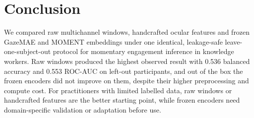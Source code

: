 \section{Conclusion}

We compared raw multichannel windows, handcrafted ocular features and frozen GazeMAE and MOMENT embeddings under one identical, leakage-safe leave-one-subject-out protocol for momentary engagement inference in knowledge workers.
Raw windows produced the highest observed result with 0.536 balanced accuracy and 0.553 ROC-AUC on left-out participants, and out of the box the frozen encoders did not improve on them, despite their higher preprocessing and compute cost.
For practitioners with limited labelled data, raw windows or handcrafted features are the better starting point, while frozen encoders need domain-specific validation or adaptation before use.
